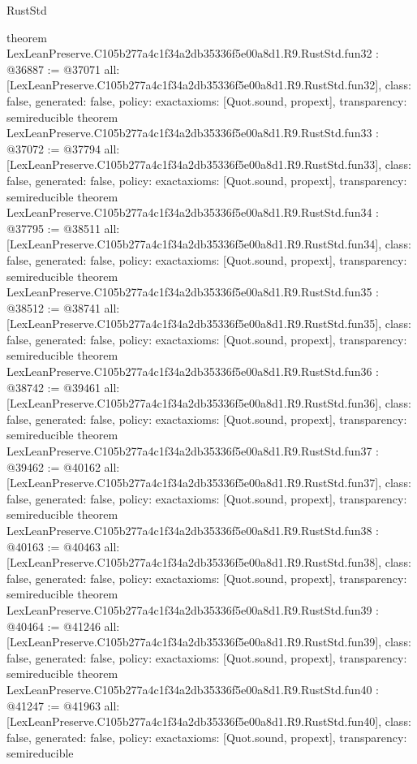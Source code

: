 \begin{lexlean}{RustStd}
\begin{coremodule}
{}
theorem LexLeanPreserve.C105b277a4c1f34a2db35336f5e00a8d1.R9.RustStd.fun32 : @36887 := @37071 {
  all: [LexLeanPreserve.C105b277a4c1f34a2db35336f5e00a8d1.R9.RustStd.fun32],
  class: false,
  generated: false,
  policy: exact{axioms: [Quot.sound, propext]},
  transparency: semireducible
}
theorem LexLeanPreserve.C105b277a4c1f34a2db35336f5e00a8d1.R9.RustStd.fun33 : @37072 := @37794 {
  all: [LexLeanPreserve.C105b277a4c1f34a2db35336f5e00a8d1.R9.RustStd.fun33],
  class: false,
  generated: false,
  policy: exact{axioms: [Quot.sound, propext]},
  transparency: semireducible
}
theorem LexLeanPreserve.C105b277a4c1f34a2db35336f5e00a8d1.R9.RustStd.fun34 : @37795 := @38511 {
  all: [LexLeanPreserve.C105b277a4c1f34a2db35336f5e00a8d1.R9.RustStd.fun34],
  class: false,
  generated: false,
  policy: exact{axioms: [Quot.sound, propext]},
  transparency: semireducible
}
theorem LexLeanPreserve.C105b277a4c1f34a2db35336f5e00a8d1.R9.RustStd.fun35 : @38512 := @38741 {
  all: [LexLeanPreserve.C105b277a4c1f34a2db35336f5e00a8d1.R9.RustStd.fun35],
  class: false,
  generated: false,
  policy: exact{axioms: [Quot.sound, propext]},
  transparency: semireducible
}
theorem LexLeanPreserve.C105b277a4c1f34a2db35336f5e00a8d1.R9.RustStd.fun36 : @38742 := @39461 {
  all: [LexLeanPreserve.C105b277a4c1f34a2db35336f5e00a8d1.R9.RustStd.fun36],
  class: false,
  generated: false,
  policy: exact{axioms: [Quot.sound, propext]},
  transparency: semireducible
}
theorem LexLeanPreserve.C105b277a4c1f34a2db35336f5e00a8d1.R9.RustStd.fun37 : @39462 := @40162 {
  all: [LexLeanPreserve.C105b277a4c1f34a2db35336f5e00a8d1.R9.RustStd.fun37],
  class: false,
  generated: false,
  policy: exact{axioms: [Quot.sound, propext]},
  transparency: semireducible
}
theorem LexLeanPreserve.C105b277a4c1f34a2db35336f5e00a8d1.R9.RustStd.fun38 : @40163 := @40463 {
  all: [LexLeanPreserve.C105b277a4c1f34a2db35336f5e00a8d1.R9.RustStd.fun38],
  class: false,
  generated: false,
  policy: exact{axioms: [Quot.sound, propext]},
  transparency: semireducible
}
theorem LexLeanPreserve.C105b277a4c1f34a2db35336f5e00a8d1.R9.RustStd.fun39 : @40464 := @41246 {
  all: [LexLeanPreserve.C105b277a4c1f34a2db35336f5e00a8d1.R9.RustStd.fun39],
  class: false,
  generated: false,
  policy: exact{axioms: [Quot.sound, propext]},
  transparency: semireducible
}
theorem LexLeanPreserve.C105b277a4c1f34a2db35336f5e00a8d1.R9.RustStd.fun40 : @41247 := @41963 {
  all: [LexLeanPreserve.C105b277a4c1f34a2db35336f5e00a8d1.R9.RustStd.fun40],
  class: false,
  generated: false,
  policy: exact{axioms: [Quot.sound, propext]},
  transparency: semireducible
}
\end{coremodule}
\end{lexlean}
